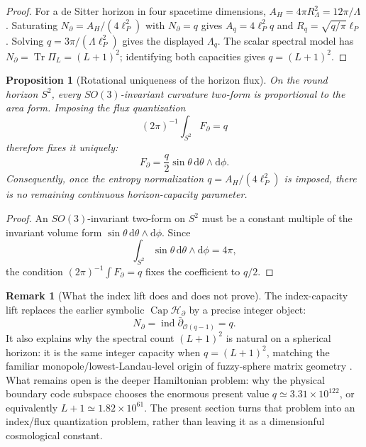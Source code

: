 \documentclass[aps,prd,reprint,nofootinbib,superscriptaddress,floatfix]{revtex4-2}
\numberwithin{equation}{section}
\theoremstyle{definition}
\newtheorem{remark}{Remark}[section]
\theoremstyle{plain}
\newtheorem{proposition}{Proposition}[section]
\newcommand{\dd}{\mathrm d}
\newcommand{\Ncap}{N_{\partial}}
\newcommand{\Hbd}{\mathcal H_{\partial}}
\newcommand{\Capacity}{\operatorname{Cap}}
\begin{document}
\begin{proof}
For a de Sitter horizon in four spacetime dimensions,
\(A_H=4\pi R_\Lambda^2=12\pi/\Lambda\).  Saturating
\(\Ncap=A_H/(4\ell_P^2)\) with \(\Ncap=q\) gives
\(A_q=4\ell_P^2q\) and \(R_q=\sqrt{q/\pi}\ell_P\).  Solving
\(q=3\pi/(\Lambda\ell_P^2)\) gives the displayed \(\Lambda_q\).
The scalar spectral model has \(\Ncap=\operatorname{Tr}\Pi_L=(L+1)^2\);
identifying both capacities gives \(q=(L+1)^2\).
\end{proof}

\begin{proposition}[Rotational uniqueness of the horizon flux]
\label{prop:rotational-flux-uniqueness}
On the round horizon \(S^2\), every \(SO(3)\)-invariant curvature two-form
is proportional to the area form.  Imposing the flux quantization
\[
(2\pi)^{-1}\int_{S^2}F_\partial=q
\]
therefore fixes it uniquely:
\begin{equation}
\boxed{
F_\partial=\frac{q}{2}\sin\theta\,\dd\theta\wedge\dd\phi .
}
\end{equation}
Consequently, once the entropy normalization \(q=A_H/(4\ell_P^2)\) is
imposed, there is no remaining continuous horizon-capacity parameter.
\end{proposition}

\begin{proof}
An \(SO(3)\)-invariant two-form on \(S^2\) must be a constant multiple of
the invariant volume form \(\sin\theta\,\dd\theta\wedge\dd\phi\).  Since
\[
\int_{S^2}\sin\theta\,\dd\theta\wedge\dd\phi=4\pi,
\]
the condition \((2\pi)^{-1}\int F_\partial=q\) fixes the coefficient to
\(q/2\).
\end{proof}

\begin{remark}[What the index lift does and does not prove]
The index-capacity lift replaces the earlier symbolic
\(\Capacity\Hbd\) by a precise integer object:
\[
\boxed{
\Ncap=\operatorname{ind}\bar\partial_{\mathcal O(q-1)}=q .
}
\]
It also explains why the spectral count \((L+1)^2\) is natural on a
spherical horizon: it is the same integer capacity when \(q=(L+1)^2\), matching the familiar monopole/lowest-Landau-level origin of fuzzy-sphere matrix geometry \cite{Hasebe2010}.
What remains open is the deeper Hamiltonian problem: why the physical
boundary code subspace chooses the enormous present value
\(q\simeq3.31\times10^{122}\), or equivalently
\(L+1\simeq1.82\times10^{61}\).  The present section turns that problem
into an index/flux quantization problem, rather than leaving it as a
dimensionful cosmological constant.
\end{remark}
\end{document}
